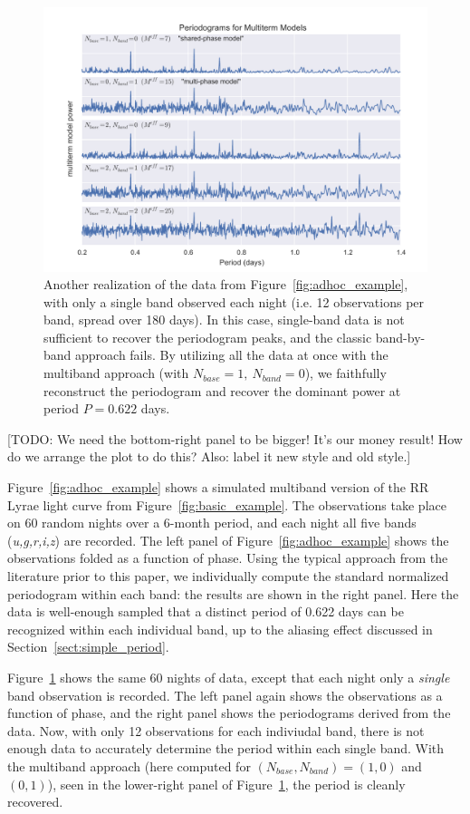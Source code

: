 \documentclass[12pt,preprint]{aastex}
\newcommand{\todo}[1]{{\color{red} [TODO: #1]}}
\newcommand{\Fig}[1]{Figure~\ref{fig:#1}}
\newcommand{\fig}[1]{\Fig{#1}}
\newcommand{\figlabel}[1]{\label{fig:#1}}
\newcommand{\Sect}[1]{Section~\ref{sect:#1}}
\newcommand{\sect}[1]{\Sect{#1}}
\begin{document}
\begin{figure}
  \centering
  \includegraphics[width=\textwidth]{fig06.pdf}
  \caption{
    Another realization of the data from \fig{adhoc_example}, with only a single
    band observed each night (i.e. 12 observations per band, spread over 180
    days). In this case, single-band data is not sufficient to recover the
    periodogram peaks, and the classic band-by-band approach fails.
    By utilizing all the data at once with the multiband approach
    (with $N_{base}=1,~N_{band}=0$),
    we faithfully reconstruct the periodogram and recover
    the dominant power at period $P=0.622$ days.
  } 
  \figlabel{multiband_sim}
\end{figure}

\todo{We need the bottom-right panel to be bigger! It's our money result! How do we arrange the plot to do this? Also: label it new style and old style.}

\fig{adhoc_example} shows a simulated multiband version of the RR Lyrae light curve from \fig{basic_example}. The observations take place on 60 random nights over a 6-month period, and each night all five bands ({\it u,g,r,i,z}) are recorded. The left panel of \fig{adhoc_example} shows the observations folded as a function of phase.
Using the typical approach from the literature prior to this paper, we individually compute the standard normalized periodogram within each band: the results are shown in the right panel. Here the data is well-enough sampled that a distinct period of 0.622 days can be recognized within each individual band, up to the aliasing effect discussed in \sect{simple_period}.

\fig{multiband_sim} shows the same 60 nights of data, except that each night only a {\it single} band observation is recorded. The left panel again shows the observations as a function of phase, and the right panel shows the periodograms derived from the data. Now, with only 12 observations for each indiviudal band, there is not enough data to accurately determine the period within each single band. With the multiband approach (here computed for $(N_{base},N_{band})=(1,0)$ and $(0,1)$), seen in the lower-right panel of \fig{multiband_sim}, the period is cleanly recovered.
\end{document}
